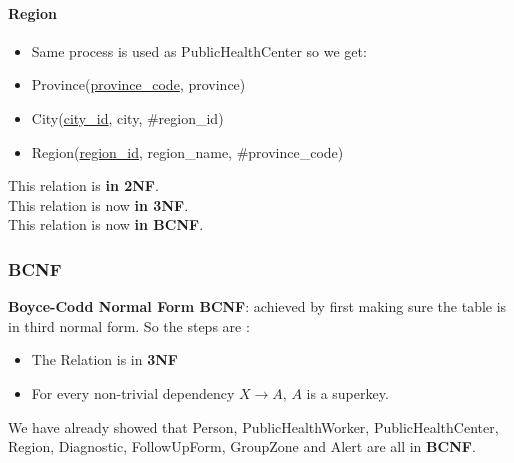 \documentclass{article}
\begin{document}
\paragraph{Region} 
\begin{itemize}
    \item Same process is used as PublicHealthCenter so we get:
    \item Province(\underline{province\_code}, province)
    \item City(\underline{city\_id}, city, \#region\_id)
    \item Region(\underline{region\_id}, region\_name, \#province\_code)
    \end{itemize}
This relation is \textbf{in 2NF}.\\
This relation is now \textbf{in 3NF}.\\
This relation is now \textbf{in BCNF}.
\subsubsection{BCNF}

\begin{tcolorbox}
    \textbf{Boyce-Codd Normal Form BCNF}: achieved by first making sure the table is in third normal form. So the steps are :
    \begin{itemize}
        \item The Relation is in \textbf{3NF}
        \item For every non-trivial dependency $X\rightarrow A$, $A$ is a superkey.
    \end{itemize}
\end{tcolorbox}

We have already showed that Person, PublicHealthWorker, PublicHealthCenter, Region, Diagnostic, FollowUpForm, GroupZone and Alert are all in \textbf{BCNF}.
\end{document}
